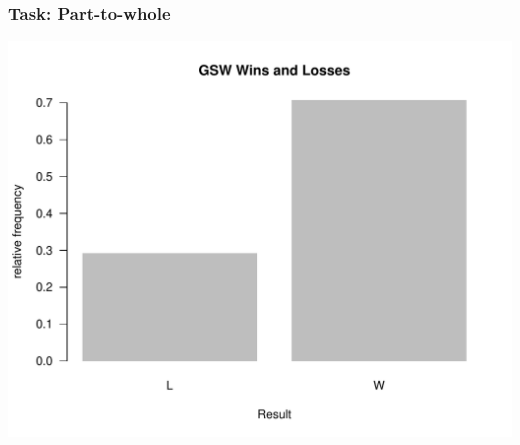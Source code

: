 \documentclass[12pt]{beamer}\usepackage[]{graphicx}\usepackage[]{color}
\makeatletter
\def\maxwidth{ %
  \ifdim\Gin@nat@width>\linewidth
    \linewidth
  \else
    \Gin@nat@width
  \fi
}
\newenvironment{knitrout}{}{} %
\makeatother
\begin{document}

\begin{frame}[fragile]
\frametitle{Task: Part-to-whole}

\begin{knitrout}\footnotesize
{}\color{fgcolor}

{\centering \includegraphics[width=\maxwidth]{figure/task_proportion-1} 

}



\end{knitrout}

\end{frame}

\end{document}
